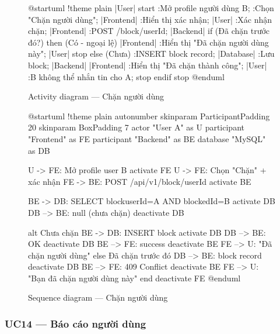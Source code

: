 \documentclass[12pt,a4paper]{report}
\begin{document}
\begin{figure}[H]
    \centering
    \begin{plantuml}
        @startuml
        !theme plain
        |User|
        start
        :Mở profile người dùng B;
        :Chọn "Chặn người dùng";
        |Frontend|
        :Hiển thị xác nhận;
        |User|
        :Xác nhận chặn;
        |Frontend|
        :POST /block/{userId};
        |Backend|
        if (Đã chặn trước đó?) then (Có - ngoại lệ)
          |Frontend|
          :Hiển thị "Đã chặn người dùng này";
          |User|
          stop
        else (Chưa)
          :INSERT block record;
          |Database|
          :Lưu block;
          |Backend|
          |Frontend|
          :Hiển thị "Đã chặn thành công";
          |User|
          :B không thể nhắn tin cho A;
          stop
        endif
        stop
        @enduml
    \end{plantuml}
    \caption{Activity diagram --- Chặn người dùng}
\end{figure}

\begin{figure}[H]
    \centering
    \begin{plantuml}
        @startuml
        !theme plain
        autonumber
        skinparam ParticipantPadding 20
        skinparam BoxPadding 7
        actor "User A" as U
        participant "Frontend" as FE
        participant "Backend" as BE
        database "MySQL" as DB

        U -> FE: Mở profile user B
        activate FE
        U -> FE: Chọn "Chặn" + xác nhận
        FE -> BE: POST /api/v1/block/{userId}
        activate BE

        BE -> DB: SELECT block\nWHERE userId=A AND blockedId=B
        activate DB
        DB --> BE: null (chưa chặn)
        deactivate DB

        alt Chưa chặn
          BE -> DB: INSERT block
          activate DB
          DB --> BE: OK
          deactivate DB
          BE --> FE: { success }
          deactivate BE
          FE --> U: "Đã chặn người dùng"
        else Đã chặn trước đó
          DB --> BE: { block record }
          deactivate DB
          BE --> FE: 409 Conflict
          deactivate BE
          FE --> U: "Bạn đã chặn người dùng này"
        end
        deactivate FE
        @enduml
    \end{plantuml}
    \caption{Sequence diagram --- Chặn người dùng}
\end{figure}

\subsubsection{UC14 --- Báo cáo người dùng}
\end{document}
